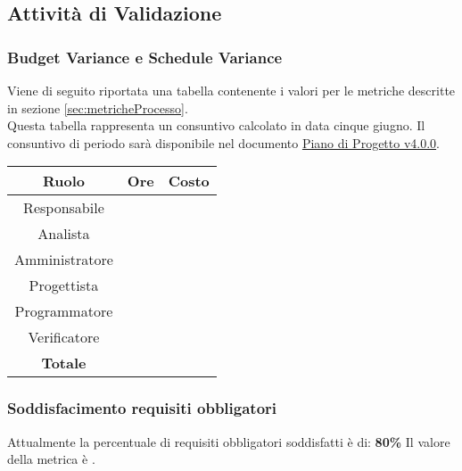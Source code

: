 \documentclass{scalatekids-article}
\begin{document}
\subsection{Attività di Validazione}

\subsubsection{Budget Variance e Schedule Variance}
Viene di seguito riportata una tabella contenente i valori per le metriche descritte in sezione \ref{sec:metricheProcesso}.\\ Questa tabella rappresenta un consuntivo calcolato in data cinque giugno. Il consuntivo di periodo sarà disponibile nel documento \href{run:./PianoDiProgetto\_v4.0.0.pdf}{Piano di Progetto v4.0.0}.
\begin{center}
  \normalsize
  \begin{tabular}{| c | c | c |}
    \hline
    \textbf{Ruolo} & \textbf{Ore} & \textbf{Costo}\\
    \hline
    Responsabile &  & \\ %
    Analista &  & \\ %
    Amministratore &  & \\ %
    Progettista &  & \\ %
    Programmatore &  & \\ %
    Verificatore &  & \\ %
    \hline
    \textbf{Totale} &  & \\
    \hline
  \end{tabular}
\end{center}

\subsubsection{Soddisfacimento requisiti obbligatori} %
Attualmente la percentuale di requisiti obbligatori soddisfatti è di: \textbf{80\%}
Il valore della metrica è .

\end{document}
